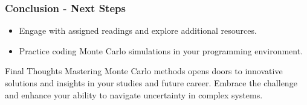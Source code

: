\documentclass[aspectratio=169]{beamer}
\begin{document}
\begin{frame}[fragile]
    \frametitle{Conclusion - Next Steps}
    \begin{itemize}
        \item Engage with assigned readings and explore additional resources.
        \item Practice coding Monte Carlo simulations in your programming environment.
    \end{itemize}
    
    \begin{block}{Final Thoughts}
    Mastering Monte Carlo methods opens doors to innovative solutions and insights in your studies and future career. Embrace the challenge and enhance your ability to navigate uncertainty in complex systems.
    \end{block}
\end{frame}
\end{document}
